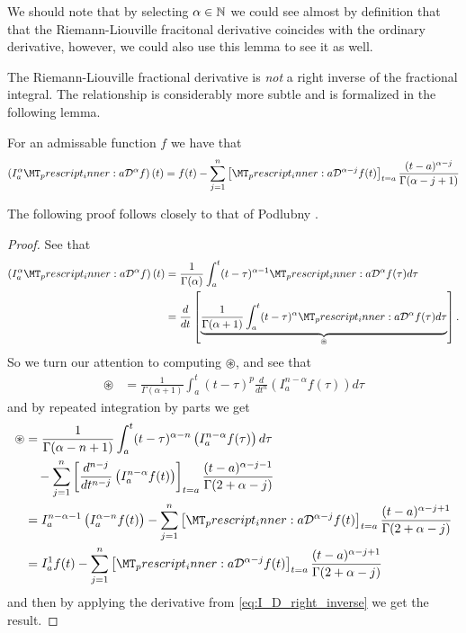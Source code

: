 We should note that  by selecting $ \alpha \in \mathbb{N} $ we could see almost by definition that that the Riemann-Liouville fracitonal derivative coincides with the ordinary derivative, however,  we could also use this lemma to see it as well.

The Riemann-Liouville fractional derivative is \emph{not} a right inverse of the fractional integral. The relationship is considerably more subtle and is formalized in the following lemma.
\begin{mdframed}[innertopmargin=10pt]
\begin{lemma}
    \label{lem:rld_right_res}
    For an admissable function $ f $ we have that
    \begin{align*}
        \left(I_a^\alpha \prescript{}{a}{\mathcal{D}}^\alpha f\right)(t) = f(t) - \sum_{j=1}^{n} \left[ \prescript{}{a}{\mathcal{D}}^{\alpha - j}f(t)\right]_{t=a} \frac{(t-a)^{\alpha - j}}{\Gamma(\alpha - j + 1)}
    \end{align*}
\end{lemma}
\end{mdframed}
The following proof follows closely to that of Podlubny \cite{Podlubny1999}.
\begin{proof}
    See that
    \begin{align}
        \left(I_a^\alpha \prescript{}{a}{\mathcal{D}}^\alpha f\right)(t) &= \frac{1}{\Gamma(\alpha)} \int_a^t (t-\tau)^{\alpha - 1} \prescript{}{a}{\mathcal{D}}^\alpha f(\tau)d\tau \\
    \label{eq:I_D_right_inverse}
    &= \frac{d}{dt} \left[ \underbrace{\frac{1}{\Gamma(\alpha + 1)} \int_a^t (t-\tau)^\alpha \prescript{}{a}{\mathcal{D}}^\alpha f(\tau) d\tau}_{\circledast}\right].
    \end{align}
So we turn our attention to computing $\circledast $,
and see that
    \begin{align*}
        \circledast &= \frac{1}{\Gamma(\alpha + 1)} \int_a^t (t-\tau)^p \frac{d}{dt^n} \left( I_a^{n - \alpha} f(\tau)\right) d\tau
    \end{align*}
and by repeated integration by parts we get
    \begin{align}
        \circledast &= \frac{1}{\Gamma(\alpha - n + 1)}\int_a^t (t-\tau)^{\alpha - n} \left( I_a^{n - \alpha}f(\tau) \right) d\tau \\
        & \ \ \ - \sum_{j=1}^n \left[ \frac{d^{n-j}}{dt^{n-j}} \left( I_a^{n - \alpha} f(t) \right) \right]_{t=a} \frac{(t-a)^{\alpha - j -1}}{\Gamma(2 + \alpha - j)} \\
        \label{eq:negative_frac_deriv_1}
        &= I_a^{n-\alpha - 1} \left( I_a^{\alpha - n} f(t) \right) - \sum_{j=1}^n \left[ \prescript{}{a}{\mathcal{D}}^{\alpha - j} f(t)\right]_{t=a} \frac{(t-a)^{\alpha - j + 1}}{\Gamma(2 + \alpha - j)} \\
        \label{eq:negative_frac_deriv_2}
        &= I_{a}^{1} f(t) - \sum_{j=1}^n \left[ \prescript{}{a}{\mathcal{D}}^{\alpha - j} f(t) \right]_{t=a} \frac{(t-a)^{\alpha - j + 1}}{\Gamma(2 + \alpha - j)}
    \end{align}
and then 
by applying the derivative from \eqref{eq:I_D_right_inverse} we get the result. 
\end{proof}

